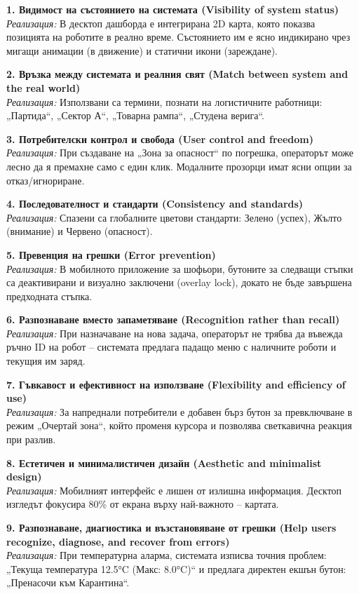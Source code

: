 \documentclass[12pt, a4paper]{article}
\begin{document}
\textbf{1. Видимост на състоянието на системата (Visibility of system status)}\\
\textit{Реализация:} В десктоп дашборда е интегрирана 2D карта, която показва позицията на роботите в реално време. Състоянието им е ясно индикирано чрез мигащи анимации (в движение) и статични икони (зареждане).

\textbf{2. Връзка между системата и реалния свят (Match between system and the real world)}\\
\textit{Реализация:} Използвани са термини, познати на логистичните работници: „Партида“, „Сектор А“, „Товарна рампа“, „Студена верига“.

\textbf{3. Потребителски контрол и свобода (User control and freedom)}\\
\textit{Реализация:} При създаване на „Зона за опасност“ по погрешка, операторът може лесно да я премахне само с един клик. Модалните прозорци имат ясни опции за отказ/игнориране.

\textbf{4. Последователност и стандарти (Consistency and standards)}\\
\textit{Реализация:} Спазени са глобалните цветови стандарти: Зелено (успех), Жълто (внимание) и Червено (опасност).

\textbf{5. Превенция на грешки (Error prevention)}\\
\textit{Реализация:} В мобилното приложение за шофьори, бутоните за следващи стъпки са деактивирани и визуално заключени (overlay lock), докато не бъде завършена предходната стъпка.

\textbf{6. Разпознаване вместо запаметяване (Recognition rather than recall)}\\
\textit{Реализация:} При назначаване на нова задача, операторът не трябва да въвежда ръчно ID на робот – системата предлага падащо меню с наличните роботи и текущия им заряд.

\textbf{7. Гъвкавост и ефективност на използване (Flexibility and efficiency of use)}\\
\textit{Реализация:} За напреднали потребители е добавен бърз бутон за превключване в режим „Очертай зона“, който променя курсора и позволява светкавична реакция при разлив.

\textbf{8. Естетичен и минималистичен дизайн (Aesthetic and minimalist design)}\\
\textit{Реализация:} Мобилният интерфейс е лишен от излишна информация. Десктоп изгледът фокусира 80\% от екрана върху най-важното – картата.

\textbf{9. Разпознаване, диагностика и възстановяване от грешки (Help users recognize, diagnose, and recover from errors)}\\
\textit{Реализация:} При температурна аларма, системата изписва точния проблем: „Текуща температура 12.5°C (Макс: 8.0°C)“ и предлага директен екшън бутон: „Пренасочи към Карантина“.
\end{document}
